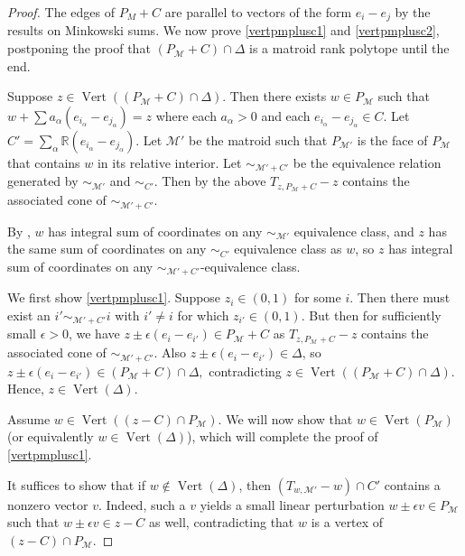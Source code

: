 \documentclass[12pt]{amsart}
\newcommand{\mb}{\mathbb}
\newcommand{\MM}{{\mathcal M}}
\newcommand{\Vt}{{\operatorname{Vert}}}
\theoremstyle{plain}
\theoremstyle{definition}
\theoremstyle{remark}
\begin{document}
\begin{proof}The edges of $P_M+C$ are parallel to vectors of the form $e_i-e_j$ by the results on Minkowski sums. We now prove \eqref{vertpmplusc1} and \eqref{vertpmplusc2}, postponing the proof that $(P_\MM+C)\cap \Delta$ is a matroid rank polytope until the end.

Suppose $z \in \Vt((P_\MM+C) \cap \Delta)$. Then there exists $w \in P_\MM$ such that $w+\sum a_{\alpha}(e_{i_\alpha}-e_{j_\alpha})=z$ where each $a_\alpha>0$ and each $e_{i_\alpha}-e_{j_\alpha} \in C$. Let $C'=\sum_{\alpha}\mb{R}(e_{i_\alpha}-e_{j_\alpha})$. Let $\MM'$ be the matroid such that $P_{\MM'}$ is the face of $P_\MM$ that contains $w$ in its relative interior. Let $\sim_{\MM'+C'}$ be the equivalence relation generated by $\sim_{\MM'}$ and $\sim_{C'}$. Then by the above $T_{z, P_\MM + C} - z$ contains the associated cone of $\sim_{\MM' + C'}$.

By , $w$ has integral sum of coordinates on any $\sim_{\MM'}$ equivalence class, and $z$ has the same sum of coordinates on any $\sim_{C'}$ equivalence class as $w$, so $z$ has integral sum of coordinates on any $\sim_{\MM'+C'}$-equivalence class.

We first show \eqref{vertpmplusc1}. Suppose $z_i \in (0,1)$ for some $i$. Then there must exist an $i'\sim_{\MM'+C'}i$ with $i' \neq i$ for which $z_{i'} \in (0,1)$. But then for sufficiently small $\epsilon>0$, we have $z\pm \epsilon(e_i-e_{i'}) \in P_\MM+C$ as $T_{z, P_\MM + C} - z$ contains the associated cone of $\sim_{\MM' + C'}$. Also $z \pm \epsilon(e_i-e_{i'}) \in \Delta$, so $z\pm \epsilon(e_i-e_{i'}) \in (P_\MM+C) \cap \Delta,$
contradicting $z \in \Vt((P_\MM+C) \cap \Delta)$. Hence, $z \in \Vt(\Delta)$.

Assume $w \in \Vt((z - C) \cap P_\MM)$. We will now show that $w \in \Vt(P_\MM)$ (or equivalently $w \in \Vt(\Delta)$), which will complete the proof of \eqref{vertpmplusc1}.

It suffices to show that if $w \not \in \Vt(\Delta)$, then $(T_{w,\MM'} -w)\cap C'$ contains a nonzero vector $v$. Indeed, such a $v$ yields a small linear perturbation $w\pm \epsilon v\in P_\MM$ such that $w \pm \epsilon v \in z-C$ as well, contradicting that $w$ is a vertex of $(z - C) \cap P_\MM$.


\end{proof}
\end{document}
